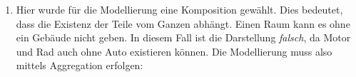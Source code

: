\documentclass{bschlangaul-aufgabe}
\begin{document}
\begin{enumerate}
\begin{bAntwort}
\end{bAntwort}

\item \strut


\begin{bAntwort}
Hier wurde für die Modellierung eine Komposition gewählt. Dies bedeutet,
dass die Existenz der Teile vom Ganzen abhängt. Einen Raum kann es \zB
ohne ein Gebäude nicht geben. In diesem Fall ist die Darstellung
\emph{falsch}, da Motor und Rad auch ohne Auto existieren können. Die
Modellierung muss also mittels Aggregation erfolgen:

\end{bAntwort}

\end{enumerate}
\end{document}
